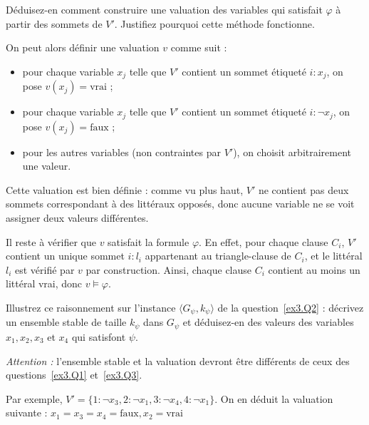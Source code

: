 \begin{exercice}
  \begin{questions}
  \item Déduisez-en comment construire une valuation des variables qui satisfait $\varphi$ à partir des sommets de $V'$.
    Justifiez pourquoi cette méthode fonctionne.
  \end{questions}
  \begin{corrections}
    On peut alors définir une valuation $v$ comme suit :
    \begin{itemize}
    \item pour chaque variable $x_j$ telle que $V'$ contient un sommet étiqueté $i : x_j$, on pose $v(x_j) = \text{vrai}$ ;
    \item pour chaque variable $x_j$ telle que $V'$ contient un sommet étiqueté $i : \lnot x_j$, on pose $v(x_j) = \text{faux}$ ;
    \item pour les autres variables (non contraintes par $V'$), on choisit arbitrairement une valeur.
    \end{itemize}

    Cette valuation est bien définie : comme vu plus haut, $V'$ ne contient pas deux sommets correspondant à des littéraux opposés, donc aucune variable ne se voit assigner deux valeurs différentes.

    Il reste à vérifier que $v$ satisfait la formule $\varphi$. En effet, pour chaque clause $C_i$, $V'$ contient un unique sommet $i : l_i$ appartenant au triangle-clause de $C_i$, et le littéral $l_i$ est vérifié par $v$ par construction. Ainsi, chaque clause $C_i$ contient au moins un littéral vrai, donc $v \models \varphi$.
  \end{corrections}
  
  \ifcorrection{\newpage}
  \begin{questions}
  \item\label{ex3.Q6} Illustrez ce raisonnement sur l'instance $\langle G_\psi, k_\psi \rangle$ de la question~\ref{ex3.Q2} :
    décrivez un ensemble stable de taille $k_\psi$ dans $G_\psi$ et déduisez-en des valeurs des variables $x_1, x_2, x_3$ et $x_4$ qui satisfont $\psi$.

    \emph{Attention : } l'ensemble stable et la valuation devront être différents de ceux des questions~\ref{ex3.Q1} et~\ref{ex3.Q3}.
  \end{questions}
  \begin{corrections}
    Par exemple, $V' = \{1 : \neg x_3, 2 : \neg x_1, 3 : \neg x_4, 4 : \neg x_1\}$. On en déduit la valuation suivante : $x_1 = x_3 = x_4 = \text{faux}, x_2 = \text{vrai}$
  \end{corrections}


\end{exercice}
